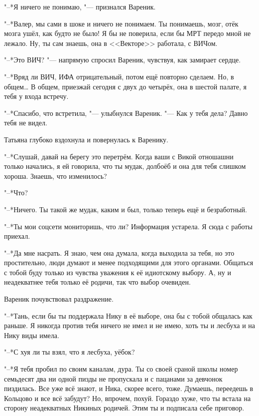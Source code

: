 "--*Я ничего не понимаю, "--- признался Вареник.

"--*Валер, мы сами в шоке и ничего не понимаем.
Ты понимаешь, мозг, отёк мозга ушёл, как будто не было!
Я бы не поверила, если бы МРТ передо мной не лежало.
Ну, ты сам знаешь, она в <<Векторе>> работала, с ВИЧом.

"--*Это ВИЧ? "--- напрямую спросил Вареник, чувствуя, как замирает сердце.

"--*Вряд ли ВИЧ, ИФА отрицательный, потом ещё повторно сделаем.
Но, в общем\ldots{}
В общем, приезжай сегодня с двух до четырёх, она в шестой палате, я тебя у входа встречу.

\asterism

\textspace

"--*Спасибо, что встретила, "--- улыбнулся Вареник.
"--- Как у тебя дела?
Давно тебя не видел.

Татьяна глубоко вздохнула и повернулась к Варенику.

"--*Слушай, давай на берегу это перетрём.
Когда ваши с Викой отношашни только начались, я ей говорила, что ты мудак, долбоёб и она для тебя слишком хороша.
Знаешь, что изменилось?

"--*Что?

"--*Ничего.
Ты такой же мудак, каким и был, только теперь ещё и безработный.

"--*Ты мои соцсети мониторишь, что ли?
Информация устарела.
Я сюда с работы приехал.

"--*Да мне насрать.
Я знаю, чем она думала, когда выходила за тебя, но это простительно, люди думают и менее подходящими для этого органами.
Общаться с тобой буду только из чувства уважения к её идиотскому выбору.
А, ну и неадекватнее тебя только её родичи, так что выбор очевиден.

Вареник почувствовал раздражение.

"--*Тань, если бы ты поддержала Нику в её выборе, она бы с тобой общалась как раньше.
Я никогда против тебя ничего не имел и не имею, хоть ты и лесбуха и на Нику виды имела.

"--*С хуя ли ты взял, что я лесбуха, уёбок?

"--*Я тебя пробил по своим каналам, дура.
Ты со своей сраной школы номер семьдесят два ни одной пизды не пропускала и с пацанами за девчонок пиздилась.
Все уже всё знают, и Ника, скорее всего, тоже.
Думаешь, переедешь в Кольцово и все всё забудут?
Но, впрочем, похуй.
Гораздо хуже, что ты встала на сторону неадекватных Никиных родичей.
Этим ты и подписала себе приговор.

